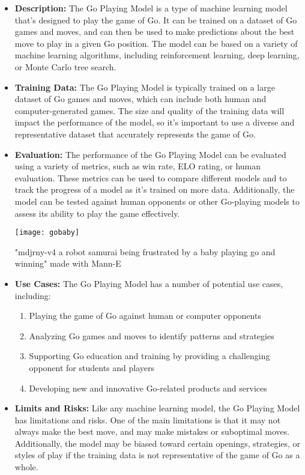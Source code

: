 \begin{itemize}
    \item \textbf{Description:} The Go Playing Model is a type of machine learning model that's designed to play the game of Go. It can be trained on a dataset of Go games and moves, and can then be used to make predictions about the best move to play in a given Go position. The model can be based on a variety of machine learning algorithms, including reinforcement learning, deep learning, or Monte Carlo tree search.
    \item \textbf{Training Data:} The Go Playing Model is typically trained on a large dataset of Go games and moves, which can include both human and computer-generated games. The size and quality of the training data will impact the performance of the model, so it's important to use a diverse and representative dataset that accurately represents the game of Go.
    \item \textbf{Evaluation:} The performance of the Go Playing Model can be evaluated using a variety of metrics, such as win rate, ELO rating, or human evaluation. These metrics can be used to compare different models and to track the progress of a model as it's trained on more data. Additionally, the model can be tested against human opponents or other Go-playing models to assess its ability to play the game effectively.
\begin{pdf}
\begin{marginfigure}[-5.5cm]
        \texttt{[image: gobaby]}
        \caption{"mdjrny-v4 a robot samurai being frustrated by a baby playing go and winning" made with Mann-E}
\end{marginfigure}
\end{pdf}    
    \item \textbf{Use Cases:} The Go Playing Model has a number of potential use cases, including:
        \begin{enumerate}  
            \item Playing the game of Go against human or computer opponents
            \item Analyzing Go games and moves to identify patterns and strategies
            \item Supporting Go education and training by providing a challenging opponent for students and players
            \item Developing new and innovative Go-related products and services
        \end{enumerate}
    \item \textbf{Limits and Risks:} Like any machine learning model, the Go Playing Model has limitations and risks. One of the main limitations is that it may not always make the best move, and may make mistakes or suboptimal moves. Additionally, the model may be biased toward certain openings, strategies, or styles of play if the training data is not representative of the game of Go as a whole.

\end{itemize}
